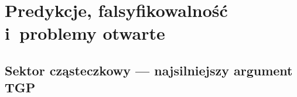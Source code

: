 \section{Predykcje, falsyfikowalno\'s\'c i~problemy otwarte}\label{sec:predykcje}

\subsection{Sektor cz\k{a}steczkowy --- najsilniejszy argument TGP}%
\label{ssec:particle-highlight}

